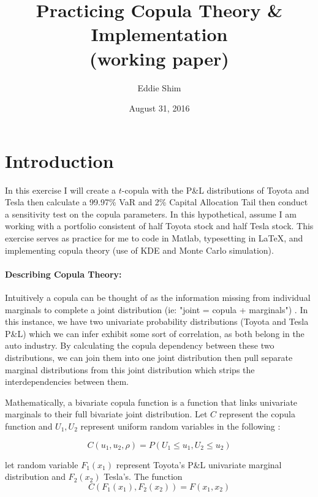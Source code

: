 \documentclass[titlepage]{article}
\author{Eddie Shim}
\title{Practicing Copula Theory \& Implementation \\ (working paper)}
\date{August 31, 2016}
\begin{document}
\maketitle
	
	
	
\section{Introduction}
In this exercise I will create a $t$-copula with the P\&L distributions of Toyota and Tesla then calculate a 99.97\% VaR and 2\% Capital Allocation Tail then conduct a sensitivity test on the copula parameters. In this hypothetical, assume I am working with a portfolio consistent of half Toyota stock and half Tesla stock. This exercise serves as practice for me to code in Matlab, typesetting in LaTeX, and implementing copula theory (use of KDE and Monte Carlo simulation). 

\paragraph{Describing Copula Theory:}

Intuitively a copula can be thought of as the information missing from individual marginals to complete a joint distribution (ie: "joint = copula + marginals")
\cite{meucci}. 
In this instance, we have two univariate probability distributions (Toyota and Tesla P\&L) which we can infer exhibit some sort of correlation, as both belong in the auto industry. By calculating the copula dependency between these two distributions, we can join them into one joint distribution then pull separate marginal distributions from this joint distribution which strips the interdependencies between them.

Mathematically, a bivariate copula function is a function that links univariate marginals to their full bivariate joint distribution. Let $C$ represent the copula function and $U_1, U_2$ represent uniform random variables in the following 
\cite{davidxli}:

\begin{equation}
C(u_1, u_2,\rho) = P(U_1 \leq u_1, U_2 \leq u_2)
\end{equation}


let random variable $F_1(x_1)$ represent Toyota's P\&L univariate marginal distribution and $F_2(x_2)$ Tesla's. The function
\begin{equation}
C(F_1(x_1), F_2(x_2)) = F(x_1,x_2)
\end{equation}
\end{document}
